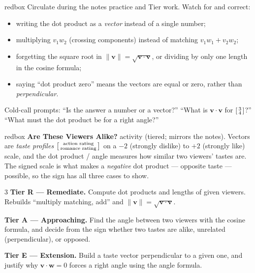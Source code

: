 \documentclass[10pt]{article}
\newcommand{\vv}{\mathbf{v}}
\newcommand{\ww}{\mathbf{w}}
\begin{document}
\begin{skillbox}{redbox}
Circulate during the notes practice and Tier work. Watch for and correct:
\begin{itemize}[leftmargin=1.2em, nosep]
  \item writing the dot product as a \emph{vector} instead of a single number;
  \item multiplying $v_1w_2$ (crossing components) instead of matching $v_1w_1+v_2w_2$;
  \item forgetting the square root in $\|\vv\|=\sqrt{\vv\cdot\vv}$, or dividing by only one length in the cosine formula;
  \item saying ``dot product zero'' means the vectors are equal or zero, rather than \emph{perpendicular}.
\end{itemize}
Cold-call prompts: ``Is the answer a number or a vector?'' ``What is $\vv\cdot\vv$ for
$\begin{bsmallmatrix} 3\\4 \end{bsmallmatrix}$?'' ``What must the dot product be for a right angle?''
\end{skillbox}

\begin{skillbox}{redbox}
\textbf{Are These Viewers Alike?} activity (tiered; mirrors the notes). Vectors are
\emph{taste profiles} $\begin{bsmallmatrix} \text{action rating} \\ \text{romance rating} \end{bsmallmatrix}$
on a $-2$ (strongly dislike) to $+2$ (strongly like) scale, and the dot product / angle measures
how similar two viewers' tastes are. The signed scale is what makes a \emph{negative} dot product
--- opposite taste --- possible, so the sign has all three cases to show.
\begin{multicols}{3}
\textbf{Tier R --- Remediate.} Compute dot products and lengths of given viewers. Rebuilds
``multiply matching, add'' and $\|\vv\|=\sqrt{\vv\cdot\vv}$.

\columnbreak
\textbf{Tier A --- Approaching.} Find the angle between two viewers with the cosine formula, and
decide from the sign whether two tastes are alike, unrelated (perpendicular), or opposed.

\columnbreak
\textbf{Tier E --- Extension.} Build a taste vector perpendicular to a given one, and justify why
$\vv\cdot\ww=0$ forces a right angle using the angle formula.
\end{multicols}
\end{skillbox}
\end{document}
